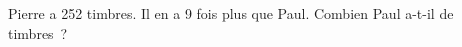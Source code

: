 \documentclass[exercice]{thedocument}%
\begin{document}
%
Pierre a 252 timbres. Il en a 9 fois plus que Paul.\vskip5pt Combien Paul
a-t-il de timbres~?
\end{document}
